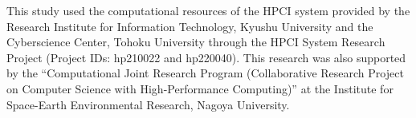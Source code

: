 \begin{acknowledgments}
This study used the computational resources of the HPCI system provided by the Research Institute for Information Technology, Kyushu University and the Cyberscience Center, Tohoku University through the HPCI System Research Project (Project IDs: hp210022 and hp220040). This research was also supported by the “Computational Joint Research Program (Collaborative Research Project on Computer Science with High-Performance Computing)” at the Institute for Space-Earth Environmental Research, Nagoya University.
\end{acknowledgments}